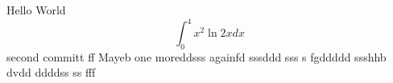 \documentclass{article}
\begin{document}
Hello World
$$\int_0^4 x^2 \ln{2x}dx$$
second committ  ff
Mayeb
one moreddsss
againfd
sssddd sss
s fgddddd
ssshhb dvdd ddddss ss fff
\end{document}
